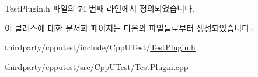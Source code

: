 Test\+Plugin.\+h 파일의 74 번째 라인에서 정의되었습니다.



이 클래스에 대한 문서화 페이지는 다음의 파일들로부터 생성되었습니다.\+:\begin{DoxyCompactItemize}
\item 
thirdparty/cpputest/include/\+Cpp\+U\+Test/\hyperlink{_test_plugin_8h}{Test\+Plugin.\+h}\item 
thirdparty/cpputest/src/\+Cpp\+U\+Test/\hyperlink{_test_plugin_8cpp}{Test\+Plugin.\+cpp}\end{DoxyCompactItemize}
